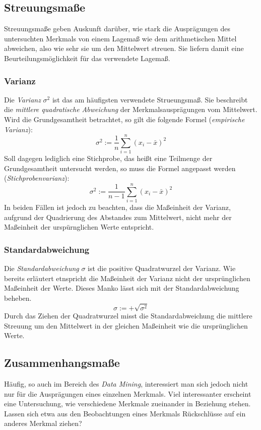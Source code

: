 \documentclass[a4paper]{scrartcl}
\begin{document}
\begin{multicols}{2}
                \subsection{Streuungsmaße}
                    Streuungsmaße geben Auskunft darüber, wie stark die Ausprägungen des untersuchten Merkmals von einem Lagemaß wie dem arithmetischen Mittel abweichen, also wie sehr sie um den Mittelwert streuen. Sie liefern damit eine Beurteilungsmöglichkeit für das verwendete Lagemaß.
                    \subsubsection{Varianz}
                        Die \emph{Varianz} $\sigma^2$ ist das am häufigsten verwendete Strueungsmaß. Sie beschreibt die \emph{mittlere quadratische Abweichung} der Merkmalsausprägungen vom Mittelwert.
                        Wird die Grundgesamtheit betrachtet, so gilt die folgende Formel (\emph{empirische Varianz}): 
                        $$ \sigma^2 := \frac{1}{n}\sum_{i=1}^n(x_i - \bar{x})^2 $$
                        Soll dagegen lediglich eine Stichprobe, das heißt eine Teilmenge der Grundgesamtheit untersucht werden, so muss die Formel angepasst werden (\emph{Stichprobenvarianz}):
                        $$ \sigma^2 := \frac{1}{n-1}\sum_{i=1}^n(x_i - \bar{x})^2  $$
                        In beiden Fällen ist jedoch zu beachten, dass die Maßeinheit der Varianz, aufgrund der Quadrierung des Abstandes zum Mittelwert, nicht mehr der Maßeinheit der urspürnglichen Werte entspricht.
                    \subsubsection{Standardabweichung}
                        Die \emph{Standardabweichung} $\sigma$ ist die positive Quadratwurzel der Varianz. Wie bereits erläutert etnspricht die Maßeinheit der Varianz nicht der ursprünglichen Maßeinheit der Werte. Dieses Manko lässt sich mit der Standardabweichung beheben.
                        $$ \sigma := + \sqrt{\sigma^2} $$
                        Durch das Ziehen der Quadratwurzel misst die Standardabweichung die mittlere Streuung um den Mittelwert in der gleichen Maßeinheit wie die ursprünglichen Werte.

                \subsection{Zusammenhangsmaße}
                    Häufig, so auch im Bereich des \emph{Data Mining}, interessiert man sich jedoch nicht nur für die Ausprägungen eines einzelnen Merkmals. Viel interessanter erscheint eine Untersuchung, wie verschiedene Merkmale zueinander in Beziehung stehen. Lassen sich etwa aus den Beobachtungen eines Merkmals Rückschlüsse auf ein anderes Merkmal ziehen?

\end{multicols}
\end{document}
